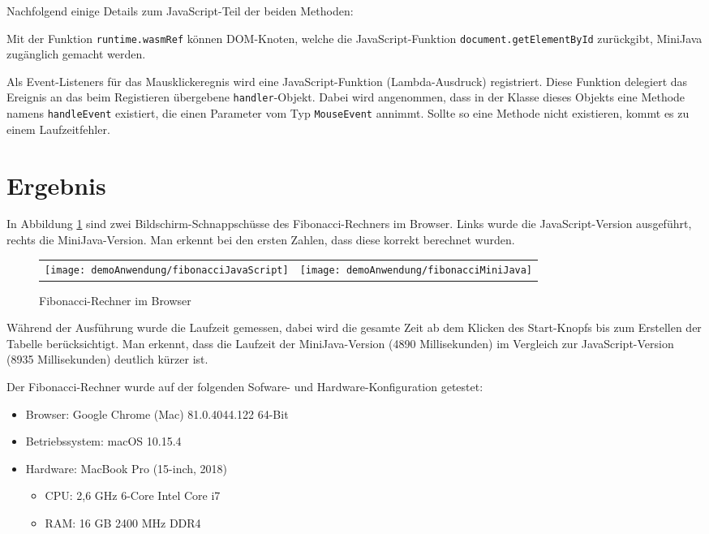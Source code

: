 Nachfolgend einige Details zum JavaScript-Teil der beiden Methoden:

Mit der Funktion \lstinline{runtime.wasmRef} können DOM-Knoten, welche die Ja\-va\-Script-Funk\-tion \lstinline{document.getElementById} zurückgibt, MiniJava zugänglich gemacht werden.

Als Event-Listeners für das Mausklickeregnis wird eine JavaScript-Funktion (Lambda-Aus\-druck) registriert. Diese Funktion delegiert das Ereignis an das beim Registieren übergebene \lstinline{handler}-Objekt. Dabei wird angenommen, dass in der Klasse dieses Objekts eine Methode namens \lstinline{handleEvent} existiert, die einen Parameter vom Typ \lstinline{MouseEvent} annimmt. Sollte so eine Methode nicht existieren, kommt es zu einem Laufzeitfehler.

\section{Ergebnis}

In Abbildung \ref{fig:fibCalculatorBrowser} sind zwei Bildschirm-Schnappschüsse des Fibonacci-Rechners im Browser. Links wurde die JavaScript-Version ausgeführt, rechts die MiniJava-Version. Man erkennt bei den ersten Zahlen, dass diese korrekt berechnet wurden.

\begin{figure}[]
    \centering
    \begin{tabular}{c c}
        \texttt{[image: demoAnwendung/fibonacciJavaScript]} & \texttt{[image: demoAnwendung/fibonacciMiniJava]}
    \end{tabular}
    \caption{Fibonacci-Rechner im Browser}
    \label{fig:fibCalculatorBrowser}
\end{figure}

Während der Ausführung wurde die Laufzeit gemessen, dabei wird die gesamte Zeit ab dem Klicken des Start-Knopfs bis zum Erstellen der Tabelle berücksichtigt. Man erkennt, dass die Laufzeit der MiniJava-Version (4890 Millisekunden) im Vergleich zur JavaScript-Version (8935 Millisekunden) deutlich kürzer ist.

Der Fibonacci-Rechner wurde auf der folgenden Sofware- und Hardware-Konfiguration getestet:
\begin{itemize}
    \item Browser: Google Chrome (Mac) 81.0.4044.122 64-Bit
    \item Betriebssystem: macOS 10.15.4
    \item Hardware: MacBook Pro (15-inch, 2018)
    \begin{itemize}
        \item CPU: 2,6 GHz 6-Core Intel Core i7
        \item RAM: 16 GB 2400 MHz DDR4
    \end{itemize}
\end{itemize}

